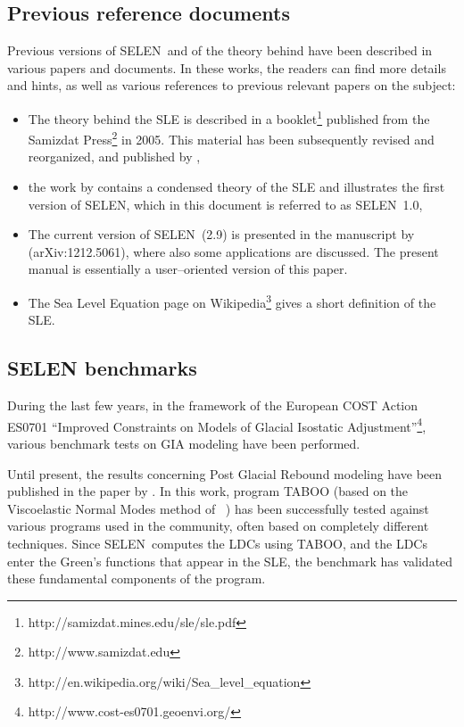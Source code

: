 \documentclass[11pt,fleqn,a4paper,titlepage]{article}
\newcommand\selen{\textsf{SELEN~}}
\newcommand\selens{\textsf{SELEN}}
\begin{document}
\subsection{Previous reference documents}
Previous versions of \selen and of the theory behind have been described in various papers and documents. 
In these works, the readers can find more details and hints, as well as various references to previous
relevant papers on the subject: 
\begin{itemize}
\item The theory behind the SLE is described in a booklet\footnote{http://samizdat.mines.edu/sle/sle.pdf}
published from the Samizdat Press\footnote{http://www.samizdat.edu} in 2005. This material has been subsequently 
revised and reorganized, and published by \citet{Spada_and_Stocchi_2006}, 
\item the work by \citet{Spada_and_Stocchi_2007} contains a condensed theory of the SLE and illustrates the 
first version of \selens, which in this document is referred to as \selen 1.0, 
\item The current version of \selen (2.9) is presented in the manuscript by \citet{Spada_etal_2012b} (arXiv:1212.5061),
where also some applications are discussed. The present manual is essentially a user--oriented version of this paper.  
\item The Sea Level Equation page on Wikipedia\footnote{http://en.wikipedia.org/wiki/Sea\_level\_equation}
gives a short definition of the SLE.
\end{itemize}

\subsection{SELEN benchmarks}

During the last few years, in the framework of the European COST Action ES0701 ``Improved Constraints on Models of 
Glacial Isostatic Adjustment''\footnote{http://www.cost-es0701.geoenvi.org/}, various benchmark tests on GIA modeling have been performed. 

Until present, the results concerning Post Glacial Rebound modeling have been published in the paper by \cite{Spada_etal_2011}. In
this work, program TABOO (based on the Viscoelastic Normal Modes method of \citeauthor{Peltier_1974}~\citeyear{Peltier_1974}) has been successfully tested against various programs used in the community, often based on completely different techniques. Since \selen computes the LDCs using TABOO, and the LDCs enter the 
Green's functions that appear in the SLE, the \cite{Spada_etal_2011} benchmark
has validated these fundamental components of the program. 
\end{document}
